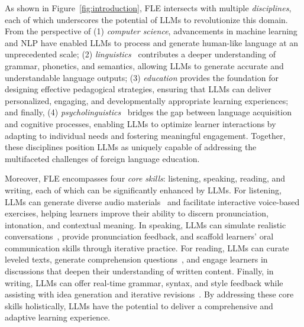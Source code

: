 As shown in Figure~\ref{fig:introduction}, FLE intersects with multiple \textit{disciplines}, each of which underscores the potential of LLMs to revolutionize this domain. From the perspective of (1) \textit{computer science}, advancements in machine learning and NLP have enabled LLMs to process and generate human-like language at an unprecedented scale; (2) \textit{linguistics}~\cite{radford2009linguistics} contributes a deeper understanding of grammar, phonetics, and semantics, allowing LLMs to generate accurate and understandable language outputs; (3) \textit{education} provides the foundation for designing effective pedagogical strategies, ensuring that LLMs can deliver personalized, engaging, and developmentally appropriate learning experiences; and finally, (4) \textit{psycholinguistics}~\cite{steinberg2013introduction} bridges the gap between language acquisition and cognitive processes, enabling LLMs to optimize learner interactions by adapting to individual needs and fostering meaningful engagement. Together, these disciplines position LLMs as uniquely capable of addressing the multifaceted challenges of foreign language education.


Moreover, FLE encompasses four \textit{core skills}: listening, speaking, reading, and writing, each of which can be significantly enhanced by LLMs. For listening, LLMs can generate diverse audio materials~\cite{ghosal2023text} and facilitate interactive voice-based exercises, helping learners improve their ability to discern pronunciation, intonation, and contextual meaning. In speaking, LLMs can simulate realistic conversations~\cite{li-etal-2024-eden}, provide pronunciation feedback, and scaffold learners’ oral communication skills through iterative practice. For reading, LLMs can curate leveled texts, generate comprehension questions~\cite{samuel-etal-2024-llms}, and engage learners in discussions that deepen their understanding of written content. Finally, in writing, LLMs can offer real-time grammar, syntax, and style feedback while assisting with idea generation and iterative revisions~\cite{stahl-etal-2024-exploring}. By addressing these core skills holistically, LLMs have the potential to deliver a comprehensive and adaptive learning experience.

